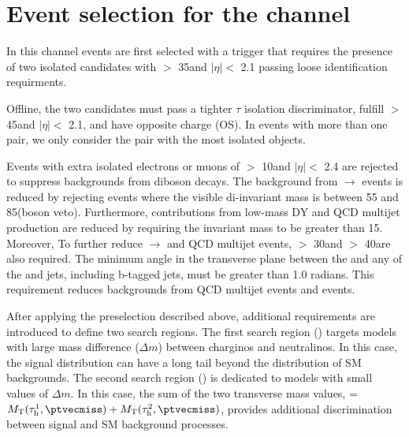 \section{\texorpdfstring{Event selection for the \tauTau channel}{Event selection for the tau-tau channel}}
\label{sect:tauTauCuts}
In this channel events are first selected with a trigger \cite{Chatrchyan:2011nv}
that requires the presence of
two isolated \Tau candidates with \PT $>$ 35\GeV and $|\eta|<$ 2.1 passing loose identification requirments.   

Offline, %
the two \Tau candidates must pass a tighter $\tau$ isolation discriminator,
fulfill \PT $>$ 45\GeV and $|\eta|<$ 2.1, and have opposite charge (OS).
In events with more than one \tauTau pair, we only consider the pair with the most isolated \Tau objects. 

Events with extra isolated electrons or muons of \PT $>$ 10\GeV and $|\eta| <$ 2.4 
are rejected to suppress %
backgrounds from diboson decays.
The background from \Z$ \rightarrow$ \tauTau events is reduced by rejecting events where the visible
di-\Tau invariant mass is between 55 and 85\GeV (\Z boson veto).  
Furthermore, contributions from low-mass DY and QCD multijet production are 
reduced by requiring the invariant mass to be greater than 15\GeV.
Moreover, To further reduce \Z$\rightarrow$ \tauTau and QCD multijet events, %
\MPT $>$ 30\GeV and \mttwo $>$ 40\GeV are also required.
The minimum angle \deltaphi in the transverse plane between the \ptvecmiss and any of the \Tau and jets, 
including b-tagged jets, must be greater than 1.0 radians. 
This requirement reduces backgrounds from QCD multijet events and \wjets events.

After applying the preselection described above,
additional requirements are introduced to define two search regions.
The first search region (\binone) targets models with large mass difference ($\Delta m$) 
between charginos and neutralinos.
In this case, the \mttwo signal distribution can have a long tail beyond the 
distribution of SM backgrounds.
The second search region (\bintwo) is dedicated to models with small values of $\Delta m$.
In this case, the sum of the two transverse mass values, \SumMT = $\mt(\Tau^1,\ptvecmiss) + \mt(\Tau^2,\ptvecmiss)$, 
provides additional discrimination between signal and SM background processes.

